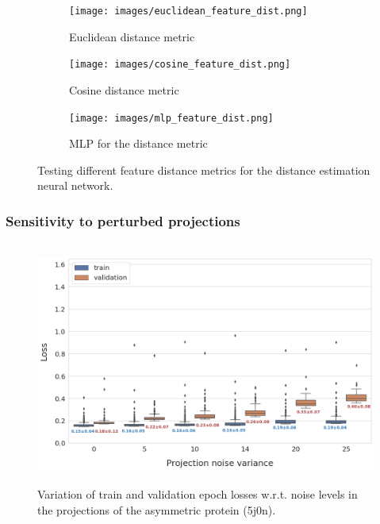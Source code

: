 \begin{figure}
    \centering
    \begin{subfigure}[b]{0.25\textwidth}
        \texttt{[image: images/euclidean\_feature\_dist.png]}
        \caption{Euclidean distance metric}
    \end{subfigure}
    \hfill
    \begin{subfigure}[b]{0.25\textwidth}
    \centering
        \texttt{[image: images/cosine\_feature\_dist.png]}
        \caption{Cosine distance metric}
    \end{subfigure}
    \hfill
    \begin{subfigure}[b]{0.25\textwidth}
    \centering
        \texttt{[image: images/mlp\_feature\_dist.png]}
        \caption{MLP for the distance metric}
    \end{subfigure}
    \caption{Testing different feature distance metrics for the distance estimation neural network.}
    \label{fig:orientation-recovery-loss}
\end{figure}

\subsubsection{Sensitivity to perturbed projections}\label{sec:results:distance-estimation:sensitivity}


\begin{figure}
    \centering
        \includegraphics[height=8cm]{images/de_noises_nums.png}
        \caption{Variation of train and validation epoch losses w.r.t. noise levels in the projections of the asymmetric protein (5j0n).}
    \label{fig:distance-estimation-vary-projection-noise}
\end{figure}

